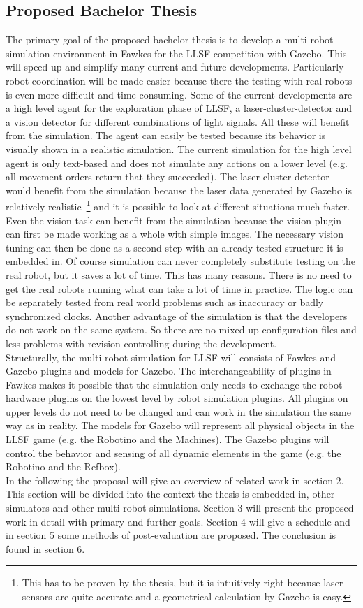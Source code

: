 \documentclass[11pt,a4paper]{article}
\begin{document}
\subsection{Proposed Bachelor Thesis}
The primary goal of the proposed bachelor thesis is to develop a multi-robot simulation environment in Fawkes for the LLSF competition with Gazebo. This will speed up and simplify many current and future developments. Particularly robot coordination will be made easier because there the testing with real robots is even more difficult and time consuming. Some of the current developments are a high level agent for the exploration phase of LLSF, a laser-cluster-detector and a vision detector for different combinations of light signals. All these will benefit from the simulation. The agent can easily be tested because its behavior is visually shown in  a realistic simulation. The current simulation for the high level agent is only text-based and does not simulate any actions on a lower level (e.g. all movement orders return that they succeeded). The laser-cluster-detector would benefit from the simulation because the laser data generated by Gazebo is relatively realistic~\footnote{This has to be proven by the thesis, but it is intuitively right because laser sensors are quite accurate and a geometrical calculation by Gazebo is easy.} and it is possible to look at different situations much faster. Even the vision task can benefit from the simulation because the vision plugin can first be made working as a whole with simple images. The necessary vision tuning can then be done as a second step with an already tested structure it is embedded in. Of course simulation can never completely substitute testing on the real robot, but it saves a lot of time. This has many reasons. There is no need to get the real robots running what can take a lot of time in practice. The logic can be separately tested from real world problems such as inaccuracy or badly synchronized clocks. Another advantage of the simulation is that the developers do not work on the same system. So there are no mixed up configuration files and less problems with revision controlling during the development.\\
Structurally, the multi-robot simulation for LLSF will consists of Fawkes and Gazebo plugins and models for Gazebo. The interchangeability of plugins in Fawkes makes it possible that the simulation only needs to exchange the robot hardware plugins on the lowest level by robot simulation plugins. All plugins on upper levels do not need to be changed and can work in the simulation the same way as in reality. The models for Gazebo will represent all physical objects in the LLSF game (e.g. the Robotino and the Machines). The Gazebo plugins will control the behavior and sensing of all dynamic elements in the game (e.g. the Robotino and the Refbox).\\
In the following the proposal will give an overview of related work in section 2. This section will be divided into the context the thesis is embedded in, other simulators and other multi-robot simulations. Section 3 will present the proposed work in detail with primary and further goals. Section 4 will give a schedule and in section 5 some methods of post-evaluation are proposed. The conclusion is found in section 6.
\end{document}
